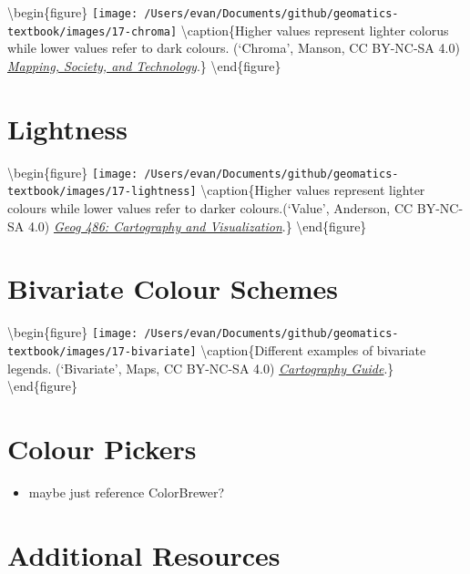 \documentclass[
]{book}
\providecommand{\tightlist}{%
  \setlength{\itemsep}{0pt}\setlength{\parskip}{0pt}}
\begin{document}
\textbackslash begin\{figure\}
\texttt{[image: /Users/evan/Documents/github/geomatics-textbook/images/17-chroma]} \textbackslash caption\{Higher values represent lighter colorus while lower values refer to dark colours. (`Chroma', \citet{Steven} Manson, CC BY-NC-SA 4.0) \href{https://www.e-education.psu.edu/geog486/node/606}{\emph{Mapping, Society, and Technology}}.\}\label{fig:17-chroma}
\textbackslash end\{figure\}

\hypertarget{lightness}{%
\section{Lightness}\label{lightness}}

\textbackslash begin\{figure\}
\texttt{[image: /Users/evan/Documents/github/geomatics-textbook/images/17-lightness]} \textbackslash caption\{Higher values represent lighter colours while lower values refer to darker colours.(`Value', \citet{Cary} Anderson, CC BY-NC-SA 4.0) \href{https://www.e-education.psu.edu/geog486/node/606}{\emph{Geog 486: Cartography and Visualization}}.\}\label{fig:17-lightness}
\textbackslash end\{figure\}

\hypertarget{bivariate-colour-schemes}{%
\section{Bivariate Colour Schemes}\label{bivariate-colour-schemes}}

\textbackslash begin\{figure\}
\texttt{[image: /Users/evan/Documents/github/geomatics-textbook/images/17-bivariate]} \textbackslash caption\{Different examples of bivariate legends. (`Bivariate', \citet{Axis} Maps, CC BY-NC-SA 4.0) \href{https://www.axismaps.com/guide/bivariate-choropleth}{\emph{Cartography Guide}}.\}\label{fig:17-bivariate}
\textbackslash end\{figure\}

\hypertarget{colour-pickers}{%
\section{Colour Pickers}\label{colour-pickers}}

\begin{itemize}
\tightlist
\item
  maybe just reference ColorBrewer?
\end{itemize}

\hypertarget{additional-resources-1}{%
\section{Additional Resources}\label{additional-resources-1}}
\end{document}

